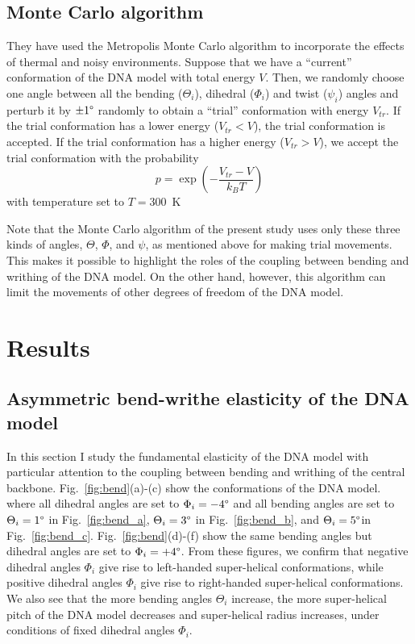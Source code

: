 \documentclass[a4paper,10pt]{article}
\begin{document}
\subsection{Monte Carlo algorithm}
They have used the Metropolis Monte Carlo algorithm to incorporate the effects of thermal and noisy environments.
Suppose that we have a ``current'' conformation of the DNA model with total energy $V$.
Then, we randomly choose one angle between all the bending ($\Theta_i$), dihedral ($\Phi_i$) and twist ($\psi_i$) angles and perturb it by $\pm1\degree$ randomly to obtain a ``trial'' conformation with energy $V_{tr}$.
If the trial conformation has a lower energy ($V_{tr}<V$), the trial conformation is accepted.
If the trial conformation has a higher energy ($V_{tr}>V$), we accept the trial conformation with the probability
\begin{equation}\label{eq:prob}
p=\exp{\left(-\dfrac{V_{tr}-V}{k_{B}T}\right)}
\end{equation}
with temperature set to $T=$\SI{300}{\kelvin}

Note that the Monte Carlo algorithm of the present study uses only these three kinds of angles, $\Theta$, $\Phi$, and $\psi$, as mentioned above for making trial movements.
This makes it possible to highlight the roles of the coupling between bending and writhing of the DNA model.
On the other hand, however, this algorithm can limit the movements of other degrees of freedom of the DNA model.

\section{Results}
\subsection{Asymmetric bend-writhe elasticity of the DNA model}\label{sec:bend_writh}
In this section I study the fundamental elasticity of the DNA model with particular attention to the coupling between bending and writhing of the central backbone.
Fig.~\ref{fig:bend}(a)-(c) show the conformations of the DNA model. where all dihedral angles are set to $\Phi_i=-4\degree$ and all bending angles are set to $\Theta_i=1\degree$ in Fig.~\ref{fig:bend_a}, $\Theta_i=3\degree$ in Fig.~\ref{fig:bend_b}, and $\Theta_i=5\degree$in  Fig.~\ref{fig:bend_c}.
Fig.~\ref{fig:bend}(d)-(f) show the same bending angles but dihedral angles are set to $\Phi_i=+4\degree$.
From these figures, we confirm that negative dihedral angles $\Phi_i$ give rise to left-handed super-helical conformations, while positive dihedral angles $\Phi_i$ give rise to right-handed super-helical conformations.
We also see that the more bending angles $\Theta_i$ increase, the more super-helical pitch of the DNA model decreases and super-helical radius increases, under conditions of fixed dihedral angles $\Phi_i$.
\end{document}
